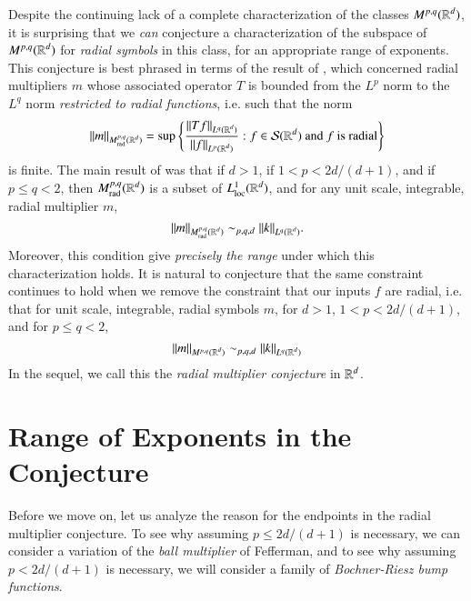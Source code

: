 Despite the continuing lack of a complete characterization of the classes $M^{p,q}(\operatorname{\mathbb{R}}^d)$, it is surprising that we \emph{can} conjecture a characterization of the subspace of $M^{p,q}(\operatorname{\mathbb{R}}^d)$ for \emph{radial symbols} in this class, for an appropriate range of exponents. This conjecture is best phrased in terms of the result of \cite{GarrigosandSeeger}, which concerned radial multipliers $m$ whose associated operator $T$ is bounded from the $L^p$ norm to the $L^q$ norm \emph{restricted to radial functions}, i.e. such that the norm
%
\[ \| m \|_{M^{p,q}_{\text{rad}}(\operatorname{\mathbb{R}}^d)} = \sup \left\{ \frac{\| Tf \|_{L^q(\operatorname{\mathbb{R}}^d)}}{\| f \|_{L^p(\operatorname{\mathbb{R}}^d)}} : f \in \mathcal{S}(\operatorname{\mathbb{R}}^d)\ \text{and $f$ is radial} \right\} \]
%
is finite. The main result of \cite{GarrigosandSeeger} was that if $d > 1$, if $1 < p < 2d/(d+1)$, and if $p \leq q < 2$, then $M^{p,q}_{\text{rad}}(\operatorname{\mathbb{R}}^d)$ is a subset of $L^1_{\text{loc}}(\operatorname{\mathbb{R}}^d)$, and for any unit scale, integrable, radial multiplier $m$,
%
\[ \| m \|_{M^{p,q}_{\text{rad}}(\operatorname{\mathbb{R}}^d)} \sim_{p,q,d} \| k \|_{L^q(\operatorname{\mathbb{R}}^d)}. \]
%
%
%
Moreover, this condition give \emph{precisely the range} under which this characterization holds. It is natural to conjecture that the same constraint continues to hold when we remove the constraint that our inputs $f$ are radial, i.e. that for unit scale, integrable, radial symbols $m$, for $d > 1$, $1 < p < 2d/(d+1)$, and for $p \leq q < 2$,
%
\[ \| m \|_{M^{p,q}(\operatorname{\mathbb{R}}^d)} \sim_{p,q,d} \| k \|_{L^q(\operatorname{\mathbb{R}}^d)} \]
%
%
%
In the sequel, we call this the \emph{radial multiplier conjecture} in $\operatorname{\mathbb{R}}^d$.

\section{Range of Exponents in the Conjecture}

Before we move on, let us analyze the reason for the endpoints in the radial multiplier conjecture. To see why assuming $p \leq 2d/(d+1)$ is necessary, we can consider a variation of the \emph{ball multiplier} of Fefferman, and to see why assuming $p < 2d/(d+1)$ is necessary, we will consider a family of \emph{Bochner-Riesz bump functions}.

